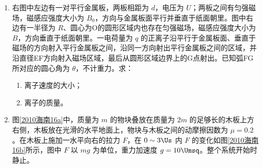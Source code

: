 \documentclass[\gkver]{gaokaozhenti}
\begin{document}
\begin{enumerate}
\item
右图中左边有一对平行金属板，两板相距为 $d$，电压为 $U$；两板之间有匀强磁场，磁感应强度大小为 $B_{0}$，方向与金属板面平行并垂直于纸面朝里。图中右边有一半径为 $R$、圆心为O的圆形区域内也存在匀强磁场，磁感应强度大小为 $B$，方向垂直于纸面朝里。一电荷量为 $q$ 的正离子沿平行于金属板面、垂直于磁场的方向射入平行金属板之间，沿同一方向射出平行金属板之间的区域，并沿直径EF方向射入磁场区域，最后从圆形区域边界上的G点射出。已知弧FG所对应的圆心角为 $\theta$，不计重力。求：

\begin{enumerate}
	\item
	离子速度的大小；
	\item
	离子的质量。
\end{enumerate}



\item
图\ref{2010海南16a}中，质量为 $m$ 的物块叠放在质量为 $2m$ 的足够长的木板上方右侧，木板放在光滑的水平地面上，物块与木板之间的动摩擦因数为 $\mu=0.2$。在木板上施加一水平向右的拉力 $F$，在 $0\sim3\Us$ 内 $F$ 的变化如图\ref{2010海南16b}所示，图中 $F$ 以 $mg$ 为单位，重力加速度 $g=10\Umsq$。整个系统开始时静止。


\end{enumerate}
\end{document}
